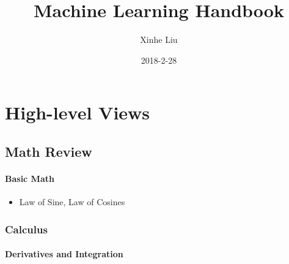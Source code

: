 \documentclass[11pt, openany]{book}              %
\title{\bf Machine Learning Handbook}    %
\author{Xinhe Liu}              %
\date{2018-2-28}                           %
\begin{document}
\maketitle                              %
\tableofcontents                        %
\mainmatter                             %

\part{High-level Views}
\chapter{Math Review}

\subsection{Basic Math}

\begin{itemize}
	\item Law of Sine, Law of Cosines
\end{itemize}

\section{Calculus}

\subsection{Derivatives and Integration}
\end{document}
